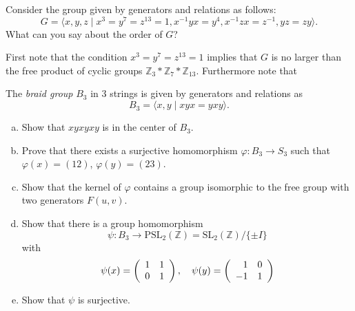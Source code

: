 \documentclass{article}
\newcounter{Problem}
\newenvironment{Problem}{\begin{Exercise}[name={Problem},
                                          counter={Problem}]}
                        {\end{Exercise}}
\begin{document}
\pagebreak

\begin{Problem}
Consider the group given by generators and relations as follows:
$$
G = \langle
      x, y, z
    \mid
      x^3 = y^7 = z^{13} = 1,
      x^{-1} y x = y^4,
      x^{-1} z x = z^{-1},
      yz = zy
    \rangle.
$$
What can you say about the order of $G$?
\end{Problem}

\begin{Answer}
First note that the condition $x^3 = y^7 = z^{13} = 1$ implies that
$G$ is no larger than the free product of cyclic groups
$\mathbb{Z}_3 \ast \mathbb{Z}_7 \ast \mathbb{Z}_{13}$. Furthermore
note that
\end{Answer}

\pagebreak

\begin{Problem}
The \emph{braid group} $B_3$ in 3 strings is given by generators and
relations as
$$
B_3 = \langle x, y \mid xyx = yxy \rangle.
$$

\begin{enumerate}[(a)]
  \item{
    Show that $xyxyxy$ is in the center of $B_3$.
  }
  \item{
    Prove that there exists a surjective homomorphism
    $\varphi : B_3 \to S_3$ such that $\varphi(x) = (12)$,
    $\varphi(y) = (23)$.
  }
  \item{
    Show that the kernel of $\varphi$ contains a group isomorphic to
    the free group with two generators $F(u,v)$.
  }
  \item{
    Show that there is a group homomorphism
    $$
    \psi : B_3
       \to \mathrm{PSL}_2(\mathbb{Z})
         = \mathrm{SL}_2(\mathbb{Z}) / \{ \pm I \}
    $$
    with
    $$
    \psi(x) =
    \left(\begin{array}{r r}
      1 & 1 \\
      0 & 1
    \end{array}\right), \quad
    \psi(y) =
    \left(\begin{array}{r r}
      1 & 0 \\
     -1 & 1
    \end{array}\right)
    $$
  }
  \item{
    Show that $\psi$ is surjective.
  }
\end{enumerate}

\end{Problem}
\end{document}
